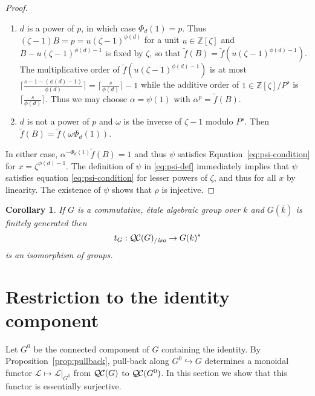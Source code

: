 \documentclass[11pt]{amsart}
\theoremstyle{plain}
\newtheorem{corollary}[theorem]{Corollary}
\theoremstyle{definition}
\theoremstyle{remark}
\newcommand{\ZZ}{{\mathbb{Z}}}
\newcommand{\bFq}{\bar{k}}
\newcommand{\Fq}{k}
\newcommand{\qcs}[1]{{\mathcal{#1}}}
\newcommand{\QC}{{\mathcal{Q\hskip-0.8pt C}}}
\newcommand{\QCiso}[1]{\QC(#1)_{/\textit{iso}}}
\newcommand{\trFrob}[1]{t_{#1}}
\begin{document}
\begin{proof}
  \begin{enumerate}
  \item $d$ is a power of $p$, in which case $\Phi_d(1) = p$.  Thus
    $(\zeta-1)B = p = u(\zeta-1)^{\phi(d)}$ for a unit $u \in \ZZ[\zeta]$
    and $B - u(\zeta-1)^{\phi(d)-1}$ is fixed by $\zeta$,
    so that $\tilde{f}(B) = \tilde{f}(u(\zeta - 1)^{\phi(d)-1})$.  The
    multiplicative order of $\tilde{f}(u(\zeta-1)^{\phi(d)-1})$ is at most
    $\lceil \frac{s - 1 - (\phi(d)-1)}{\phi(d)}\rceil = \lceil \frac{s}{\phi(d)} \rceil - 1$
    while the additive order of $1 \in \ZZ[\zeta]/P^s$ is $\lceil \frac{s}{\phi(d)} \rceil$.
    Thus we may choose $\alpha = \psi(1)$ with $\alpha^p = \tilde{f}(B)$.
  \item $d$ is not a power of $p$ and $\omega$ is the inverse of
    $\zeta-1$ modulo $P^s$.  Then $\tilde{f}(B) = \tilde{f}(\omega\Phi_d(1))$.
  \end{enumerate}
  In either case, $\alpha^{-\Phi_d(1)}\tilde{f}(B) = 1$ and thus
  $\psi$ satisfies Equation~\eqref{eq:psi-condition} for
  $x = \zeta^{\phi(d)-1}$.  The definition of $\psi$ in \ref{eq:psi-def}
  immediately implies that $\psi$ satisfies equation
  \ref{eq:psi-condition} for lesser powers of $\zeta$, and thus for
  all $x$ by linearity.  The existence of $\psi$ shows that $\rho$ is injective.
\end{proof}

\begin{corollary}
 If $G$ is a commutative, \'etale algebraic group over $\Fq$ and $G(\bFq)$ is finitely
 generated then
  \[
  \trFrob{G} : \QCiso{G} \to G(\Fq)^*
  \]
  is an isomorphism of groups.
\end{corollary}

\section{Restriction to the identity component} \label{sec:restriction}

%

Let $G^0$ be the connected component of $G$ containing the identity.
By Proposition~\ref{prop:pullback}, pull-back along
$G^0\hookrightarrow G$ determines a monoidal functor
$\qcs{L}\mapsto \qcs{L}\vert_{G^0}$ from $\QC(G)$ to $\QC(G^0)$.  In
this section we show that this functor is essentially surjective. 
\end{document}
